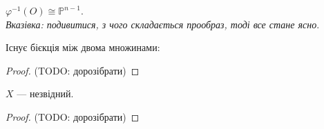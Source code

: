 \documentclass{math_library}
\begin{document}
\begin{lemma}
$\varphi^{-1}(O) \cong \mathbb{P}^{n-1}$.\\
\textit{Вказівка: подивитися, з чого складається прообраз, тоді все стане ясно}.
\end{lemma}

\begin{lemma}
Існує бієкція між двома множинами:
\begin{figure}[H]
\centering
{}
\end{figure}
\end{lemma}

\begin{proof}
(TODO: дорозібрати)
\end{proof}

\begin{lemma}
$X$ --- незвідний.
\end{lemma}

\begin{proof}
(TODO: дорозібрати)
\end{proof}
\end{document}
